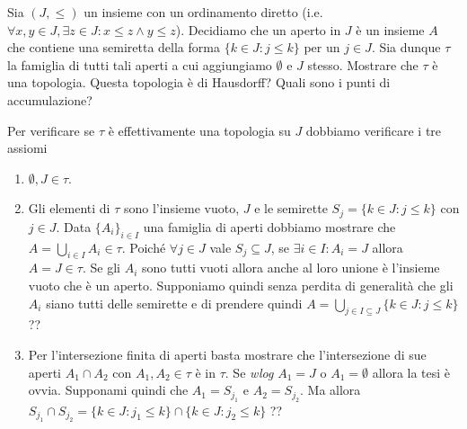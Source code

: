 \begin{es}
  Sia $ (J, \leq) $ un insieme con un ordinamento diretto (i.e. $ \forall x, y \in J, \exists z \in J : x \leq z \wedge y \leq z $). Decidiamo che un aperto in $ J $ è un insieme $ A $ che contiene una semiretta della forma $ \{k \in J : j \leq k\} $ per un $ j \in J $. Sia dunque $ \tau $ la famiglia di tutti tali aperti a cui aggiungiamo $ \emptyset $ e $ J $ stesso. Mostrare che $ \tau $ è una topologia. Questa topologia è di Hausdorff? Quali sono i punti di accumulazione?
\end{es}
%
Per verificare se $ \tau $ è effettivamente una topologia su $ J $ dobbiamo verificare i tre assiomi
\begin{enumerate}[label = (\roman*)]
\item $ \emptyset, J \in \tau $.
\item Gli elementi di $ \tau $ sono l'insieme vuoto, $ J $ e le semirette $ S_j = \{k \in J : j \leq k\} $ con $ j \in J $. Data $ \{A_i\}_{i \in I} $ una famiglia di aperti dobbiamo mostrare che $ A = \bigcup_{i \in I} A_i \in \tau $. Poiché $ \forall j \in J $ vale $ S_j \subseteq J $, se $ \exists i \in I : A_i = J $ allora $ A = J \in \tau $. Se gli $ A_i $ sono tutti vuoti allora anche al loro unione è l'insieme vuoto che è un aperto. Supponiamo quindi senza perdita di generalità che gli $ A_i $ siano tutti delle semirette e di prendere quindi $ A = \bigcup_{j \in I \subseteq J} \{k \in J : j \leq k\} $ ??
\item Per l'intersezione finita di aperti basta mostrare che l'intersezione di sue aperti $ A_1 \cap A_2 $ con $ A_1, A_2 \in \tau $ è in $ \tau $. Se \emph{wlog} $ A_1 = J $ o $ A_1 = \emptyset $ allora la tesi è ovvia. Supponami quindi che $ A_1 = S_{j_1} $ e $ A_2 = S_{j_2} $. Ma allora $ S_{j_1} \cap S_{j_2} = \{k \in J : j_1 \leq k\} \cap \{k \in J : j_2 \leq k\} $ ??
\end{enumerate}

